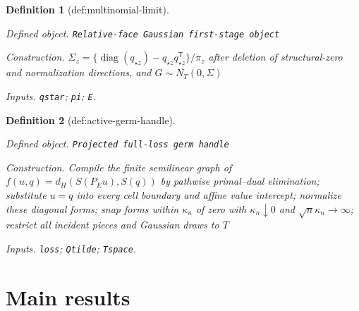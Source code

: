 \documentclass{article}
\newtheorem{definition}{Definition}
\begin{document}
\begin{definition}[def:multinomial-limit]\label{def:multinomial-limit}
\par\smallskip\noindent\emph{Defined object.} \texttt{Relative-\allowbreak{}face Gaussian first-\allowbreak{}stage object}
\par\smallskip\noindent\emph{Construction.} \(\Sigma_z=\{\operatorname{diag}(q_{\star z})-q_{\star z}q_{\star z}^{\mathsf T}\}/\pi_z\) after deletion of structural-zero and normalization directions, and \(G\sim N_T(0,\Sigma)\)
\par\smallskip\noindent\emph{Inputs.} \texttt{qstar}; \texttt{pi}; \texttt{E}.
\end{definition}

\begin{definition}[def:active-germ-handle]\label{def:active-germ-handle}
\par\smallskip\noindent\emph{Defined object.} \texttt{Projected full-\allowbreak{}loss germ handle}
\par\smallskip\noindent\emph{Construction.} Compile the finite semilinear graph of \(f(u,q)=d_H(S(P_Eu),S(q))\) by pathwise primal--dual elimination; substitute \(u=q\) into every cell boundary and affine value intercept; normalize these diagonal forms; snap forms within \(\kappa_n\) of zero with \(\kappa_n\downarrow0\) and \(\sqrt n\kappa_n\to\infty\); restrict all incident pieces and Gaussian draws to \(T\)
\par\smallskip\noindent\emph{Inputs.} \texttt{loss}; \texttt{Qtilde}; \texttt{Tspace}.
\end{definition}

\section{Main results}
\end{document}
